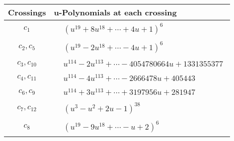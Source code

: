\documentclass[1p]{elsarticle_modified}
\theoremstyle{definition}
\begin{document}
\begin{tabular}{m{50pt}|m{274pt}}
Crossings & \hspace{64pt}u-Polynomials at each crossing \\
\hline $$\begin{aligned}c_{1}\end{aligned}$$&$\begin{aligned}
&(u^{19}+8 u^{18}+\cdots+4 u+1)^{6}
\end{aligned}$\\
\hline $$\begin{aligned}c_{2},c_{5}\end{aligned}$$&$\begin{aligned}
&(u^{19}-2 u^{18}+\cdots-4 u+1)^{6}
\end{aligned}$\\
\hline $$\begin{aligned}c_{3},c_{10}\end{aligned}$$&$\begin{aligned}
&u^{114}-2 u^{113}+\cdots-4054780664 u+1331355377
\end{aligned}$\\
\hline $$\begin{aligned}c_{4},c_{11}\end{aligned}$$&$\begin{aligned}
&u^{114}-4 u^{113}+\cdots-2666478 u+405443
\end{aligned}$\\
\hline $$\begin{aligned}c_{6},c_{9}\end{aligned}$$&$\begin{aligned}
&u^{114}+3 u^{113}+\cdots+3197956 u+281947
\end{aligned}$\\
\hline $$\begin{aligned}c_{7},c_{12}\end{aligned}$$&$\begin{aligned}
&(u^3- u^2+2 u-1)^{38}
\end{aligned}$\\
\hline $$\begin{aligned}c_{8}\end{aligned}$$&$\begin{aligned}
&(u^{19}-9 u^{18}+\cdots- u+2)^{6}
\end{aligned}$\\
\hline
\end{tabular}\\~\\
\end{document}
